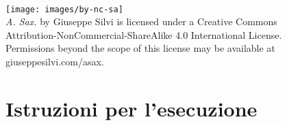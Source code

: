 \documentclass[10pt, a4paper, twoside]{book}
\title{{
	\fontsize{19}{10}\selectfont{
	\theName
	} \\
	\bigskip {
	\fontsize{81}{10}\selectfont{
	\vspace{6cm}\theTitle
	}}}}
\author{
	\fontsize{19}{10}\selectfont{
	\textit{
		\scoredFor
	}}}
\date{
	\emph{{
	\LARGE \date
	}}\vfill
	}
\newcommand\frameattext[3]{%
  \linethickness{#3}%
  \AddToShipoutPicture*{%
    \AtTextLowerLeft{%
       \put(\LenToUnit{-,5\extraxsep},\LenToUnit{-0.5\extraysep}){\color{#1}%
             \rule{\dimexpr\textwidth+\extraxsep\relax}{\dimexpr\textheight+\extraysep\relax}}%
       \put(\LenToUnit{-,5\extraxsep},\LenToUnit{-0.5\extraysep}){\color{#2}%
       \framebox(\LenToUnit{\dimexpr\textwidth+\extraxsep\relax},%
                 \LenToUnit{\dimexpr\textheight+\extraysep\relax}){}
       }
    }%
  }%
}
\begin{document}

\setlength{\columnsep}{.4in}



\frameattext{white}{black}{2pt}

\begin{center}
	~\\
	\vfill
    \fontsize{19}{10}\selectfont{Giuseppe SILVI} \\
		\vspace{2cm}
    \fontsize{81}{10}\selectfont{A. SAX.} \\
		\vspace{.5cm}
	\fontsize{19}{10} \\
		\vspace{.5cm}
	\fontsize{13}{10}\selectfont{2013--2015} \\
		\vspace{16cm}
	\fontsize{13}{10}\selectfont{GS006-E002} \\
\end{center}

\thispagestyle{empty}



\clearpage

\thispagestyle{empty}

~\vfill

\texttt{[image: images/by-nc-sa]}\\
\emph{A. Sax.} by Giuseppe Silvi is licensed under a Creative Commons \\
Attribution-NonCommercial-ShareAlike 4.0 International License.\\ 
Permissions beyond the scope of this license may be available at\\
giuseppesilvi.com/asax.%


\clearpage


\section*{Istruzioni per l'esecuzione}
\end{document}
